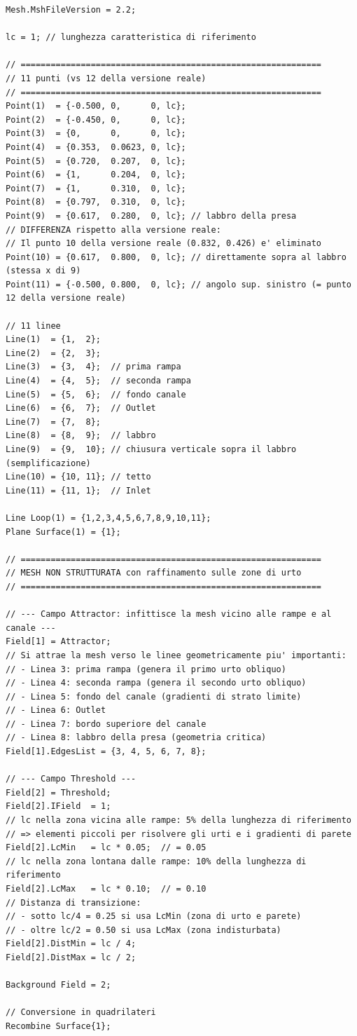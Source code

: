 \begin{lstlisting}[style=gmsh, caption={File \texttt{doppia\_presa\_semplificata.geo} -- geometria semplificata con raffinamento.}, label={lst:presa_sempl}]
Mesh.MshFileVersion = 2.2;

lc = 1; // lunghezza caratteristica di riferimento

// ============================================================
// 11 punti (vs 12 della versione reale)
// ============================================================
Point(1)  = {-0.500, 0,      0, lc};
Point(2)  = {-0.450, 0,      0, lc};
Point(3)  = {0,      0,      0, lc};
Point(4)  = {0.353,  0.0623, 0, lc};
Point(5)  = {0.720,  0.207,  0, lc};
Point(6)  = {1,      0.204,  0, lc};
Point(7)  = {1,      0.310,  0, lc};
Point(8)  = {0.797,  0.310,  0, lc};
Point(9)  = {0.617,  0.280,  0, lc}; // labbro della presa
// DIFFERENZA rispetto alla versione reale:
// Il punto 10 della versione reale (0.832, 0.426) e' eliminato
Point(10) = {0.617,  0.800,  0, lc}; // direttamente sopra al labbro (stessa x di 9)
Point(11) = {-0.500, 0.800,  0, lc}; // angolo sup. sinistro (= punto 12 della versione reale)

// 11 linee
Line(1)  = {1,  2};
Line(2)  = {2,  3};
Line(3)  = {3,  4};  // prima rampa
Line(4)  = {4,  5};  // seconda rampa
Line(5)  = {5,  6};  // fondo canale
Line(6)  = {6,  7};  // Outlet
Line(7)  = {7,  8};
Line(8)  = {8,  9};  // labbro
Line(9)  = {9,  10}; // chiusura verticale sopra il labbro (semplificazione)
Line(10) = {10, 11}; // tetto
Line(11) = {11, 1};  // Inlet

Line Loop(1) = {1,2,3,4,5,6,7,8,9,10,11};
Plane Surface(1) = {1};

// ============================================================
// MESH NON STRUTTURATA con raffinamento sulle zone di urto
// ============================================================

// --- Campo Attractor: infittisce la mesh vicino alle rampe e al canale ---
Field[1] = Attractor;
// Si attrae la mesh verso le linee geometricamente piu' importanti:
// - Linea 3: prima rampa (genera il primo urto obliquo)
// - Linea 4: seconda rampa (genera il secondo urto obliquo)
// - Linea 5: fondo del canale (gradienti di strato limite)
// - Linea 6: Outlet
// - Linea 7: bordo superiore del canale
// - Linea 8: labbro della presa (geometria critica)
Field[1].EdgesList = {3, 4, 5, 6, 7, 8};

// --- Campo Threshold ---
Field[2] = Threshold;
Field[2].IField  = 1;
// lc nella zona vicina alle rampe: 5% della lunghezza di riferimento
// => elementi piccoli per risolvere gli urti e i gradienti di parete
Field[2].LcMin   = lc * 0.05;  // = 0.05
// lc nella zona lontana dalle rampe: 10% della lunghezza di riferimento
Field[2].LcMax   = lc * 0.10;  // = 0.10
// Distanza di transizione:
// - sotto lc/4 = 0.25 si usa LcMin (zona di urto e parete)
// - oltre lc/2 = 0.50 si usa LcMax (zona indisturbata)
Field[2].DistMin = lc / 4;
Field[2].DistMax = lc / 2;

Background Field = 2;

// Conversione in quadrilateri
Recombine Surface{1};
\end{lstlisting}

